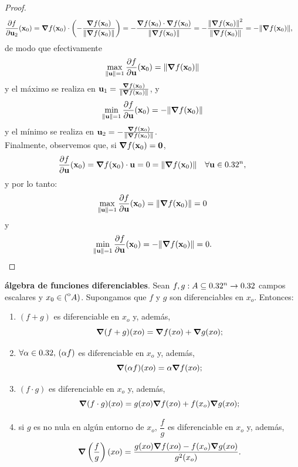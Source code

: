 \begin{theorem}
\begin{proof}
\begin{align*}
%  
 \frac{\partial f}{\partial {\mathbf{u}}_2} (\mathbf{x}_0) &= \grad f (\mathbf{x}_0) \cdot \left( - \frac{\grad f(\mathbf{x}_0)}{\norm{\grad f(\mathbf{x}_0)}} \right) = -\frac{ \grad f (\mathbf{x}_0) \cdot \grad f(\mathbf{x}_0) }{\norm{\grad f(\mathbf{x}_0)}} = -\frac{\norm{\grad f (\mathbf{x}_0)}^2 }{\norm{\grad f(\mathbf{x}_0)}} = -\norm{\grad f (\mathbf{x}_0)},
\end{align*}
de modo que efectivamente
\[
 \max_{\norm{{\mathbf{u}}}=1} \frac{\partial f}{\partial {\mathbf{u}}} (\mathbf{x}_0) = \norm{\grad f (\mathbf{x}_0)}
\]
y el m\'aximo se realiza en ${\mathbf{u}}_1 = \frac{\grad f(\mathbf{x}_0)}{\norm{\grad f(\mathbf{x}_0)}}$,
y
\[
 \min_{\norm{{\mathbf{u}}}=1} \frac{\partial f}{\partial {\mathbf{u}}} (\mathbf{x}_0) = -\norm{\grad f (\mathbf{x}_0)}
\]
y el m\'inimo se realiza en ${\mathbf{u}}_2 = -\frac{\grad f(\mathbf{x}_0)}{\norm{\grad f(\mathbf{x}_0)}}$. \\

Finalmente, observemos que, si $\grad f(\mathbf{x}_0) = \mathbf{0}$, 
\[
 \frac{\partial f}{\partial {\mathbf{u}}} (\mathbf{x}_0) = \grad f (\mathbf{x}_0) \cdot {\mathbf{u}} = 0 = \norm{\grad f(\mathbf{x}_0)} \quad \forall {\mathbf{u}} \in 0.32^n,
\]
y por lo tanto:
\[
 \max_{\norm{{\mathbf{u}}}=1} \frac{\partial f}{\partial {\mathbf{u}}} (\mathbf{x}_0) = \norm{\grad f(\mathbf{x}_0)} = 0
\]
y
\[
 \min_{\norm{{\mathbf{u}}}=1} \frac{\partial f}{\partial {\mathbf{u}}} (\mathbf{x}_0) = -\norm{\grad f(\mathbf{x}_0)} = 0.
\]
\end{proof}
\end{theorem}




\begin{propertie}\label{prop:alg_dif} \textbf{\'algebra de funciones diferenciables}.  Sean $f,g:A  \subseteq  0.32^n \to 0.32$ campos escalares y $x_0 \in {\kern0pt(}^{\mathrm{o}}A)$. Supongamos que
$f$ y $g$ son diferenciables en $x_o$.
  Entonces:
  \begin{enumerate} 
   \item[1.] $(f + g)$ es diferenciable en $x_o$ y, adem\'as,
   \[
    \grad(f + g)(xo) = \grad f(xo) + \grad g(xo);
   \]

   \item[2.] $\forall \alpha \in 0.32, \, (\alpha f)$  es diferenciable en $x_o$ y, adem\'as,
   \[
    \grad(\alpha f)(xo) = \alpha \grad f(xo);
   \]

   \item[3.] $(f \cdot g)$ es diferenciable en $x_o$ y, adem\'as,
   \[
    \grad(f \cdot g)(xo) = g(xo) \grad f(xo) + f(x_o) \grad g(xo);
   \]

   \item[4.] si $g$ es no nula en alg\'un entorno de $x_o$, $\dfrac{f}{g}$ es diferenciable en $x_o$ y, adem\'as,
   \[
    \grad \left( \dfrac{f}{g} \right)  (xo) = \frac{g(xo) \grad f(xo) - f(x_o) \grad g(xo)}{g^2(x_o)}.
   \]
\end{enumerate}
\end{propertie}

